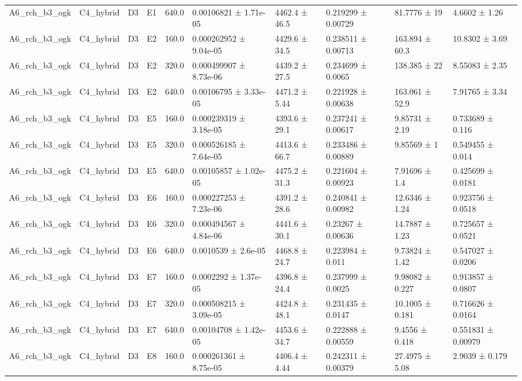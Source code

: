 \begin{table}
\begin{tabular}{llllllllll}
A6\_rch\_b3\_ogk & C4\_hybrid & D3 & E1 & 640.0 & 0.00106821 ± 1.71e-05 & 4462.4 ± 46.5 & 0.219299 ± 0.00729 & 81.7776 ± 19 & 4.6602 ± 1.26 \\
A6\_rch\_b3\_ogk & C4\_hybrid & D3 & E2 & 160.0 & 0.000262952 ± 9.04e-05 & 4429.6 ± 34.5 & 0.238511 ± 0.00713 & 163.894 ± 60.3 & 10.8302 ± 3.69 \\
A6\_rch\_b3\_ogk & C4\_hybrid & D3 & E2 & 320.0 & 0.000499907 ± 8.73e-06 & 4439.2 ± 27.5 & 0.234699 ± 0.0065 & 138.385 ± 22 & 8.55083 ± 2.35 \\
A6\_rch\_b3\_ogk & C4\_hybrid & D3 & E2 & 640.0 & 0.00106795 ± 3.33e-05 & 4471.2 ± 5.44 & 0.221928 ± 0.00638 & 163.061 ± 52.9 & 7.91765 ± 3.34 \\
A6\_rch\_b3\_ogk & C4\_hybrid & D3 & E5 & 160.0 & 0.000239319 ± 3.18e-05 & 4393.6 ± 29.1 & 0.237241 ± 0.00617 & 9.85731 ± 2.19 & 0.733689 ± 0.116 \\
A6\_rch\_b3\_ogk & C4\_hybrid & D3 & E5 & 320.0 & 0.000526185 ± 7.64e-05 & 4413.6 ± 66.7 & 0.233486 ± 0.00889 & 9.85569 ± 1 & 0.549455 ± 0.014 \\
A6\_rch\_b3\_ogk & C4\_hybrid & D3 & E5 & 640.0 & 0.00105857 ± 1.02e-05 & 4475.2 ± 31.3 & 0.221604 ± 0.00923 & 7.91696 ± 1.4 & 0.425699 ± 0.0181 \\
A6\_rch\_b3\_ogk & C4\_hybrid & D3 & E6 & 160.0 & 0.000227253 ± 7.23e-06 & 4391.2 ± 28.6 & 0.240841 ± 0.00982 & 12.6346 ± 1.24 & 0.923756 ± 0.0518 \\
A6\_rch\_b3\_ogk & C4\_hybrid & D3 & E6 & 320.0 & 0.000494567 ± 4.84e-06 & 4441.6 ± 30.1 & 0.23267 ± 0.00636 & 14.7887 ± 1.23 & 0.725657 ± 0.0521 \\
A6\_rch\_b3\_ogk & C4\_hybrid & D3 & E6 & 640.0 & 0.0010539 ± 2.6e-05 & 4468.8 ± 24.7 & 0.223984 ± 0.011 & 9.73824 ± 1.42 & 0.547027 ± 0.0206 \\
A6\_rch\_b3\_ogk & C4\_hybrid & D3 & E7 & 160.0 & 0.0002292 ± 1.37e-05 & 4396.8 ± 24.4 & 0.237999 ± 0.0025 & 9.98082 ± 0.227 & 0.913857 ± 0.0807 \\
A6\_rch\_b3\_ogk & C4\_hybrid & D3 & E7 & 320.0 & 0.000508215 ± 3.09e-05 & 4424.8 ± 48.1 & 0.231435 ± 0.0147 & 10.1005 ± 0.181 & 0.716626 ± 0.0164 \\
A6\_rch\_b3\_ogk & C4\_hybrid & D3 & E7 & 640.0 & 0.00104708 ± 1.42e-05 & 4453.6 ± 34.7 & 0.222888 ± 0.00559 & 9.4556 ± 0.418 & 0.551831 ± 0.00979 \\
A6\_rch\_b3\_ogk & C4\_hybrid & D3 & E8 & 160.0 & 0.000261361 ± 8.75e-05 & 4406.4 ± 4.44 & 0.242311 ± 0.00379 & 27.4975 ± 5.08 & 2.9039 ± 0.179 \\

\end{tabular}
\end{table}
